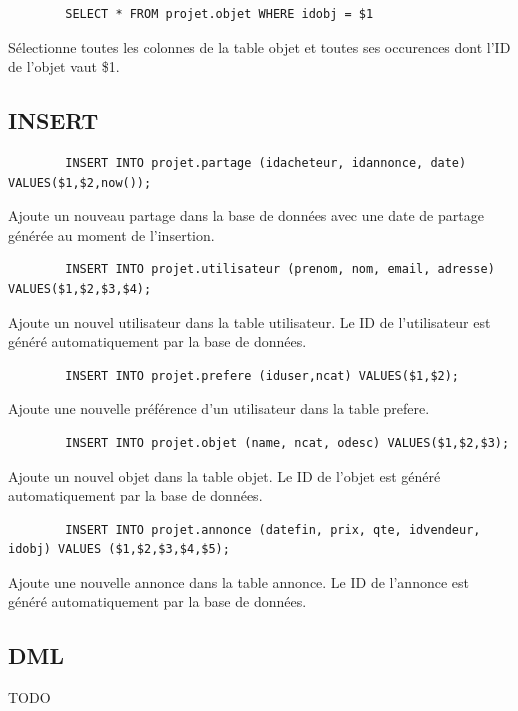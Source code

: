 \documentclass[a4paper,12pt]{article}
\begin{document}
\begin{spacing}{1}
    \begin{verbatim}
        SELECT * FROM projet.objet WHERE idobj = $1
    \end{verbatim}
Sélectionne toutes les colonnes de la table objet et toutes ses occurences dont l'ID de l'objet vaut \$1.

    \subsection*{INSERT}
    
    \begin{verbatim}
        INSERT INTO projet.partage (idacheteur, idannonce, date) VALUES($1,$2,now());
    \end{verbatim}
    Ajoute un nouveau partage dans la base de données avec une date de partage générée au moment de l'insertion.
    
    \begin{verbatim}
        INSERT INTO projet.utilisateur (prenom, nom, email, adresse) VALUES($1,$2,$3,$4);
    \end{verbatim}
    Ajoute un nouvel utilisateur dans la table utilisateur. Le ID de l'utilisateur est généré automatiquement par la base de données. 

    \begin{verbatim}
        INSERT INTO projet.prefere (iduser,ncat) VALUES($1,$2);
    \end{verbatim}
    Ajoute une nouvelle préférence d'un utilisateur dans la table prefere.
    
    \begin{verbatim}
        INSERT INTO projet.objet (name, ncat, odesc) VALUES($1,$2,$3);
    \end{verbatim}
    Ajoute un nouvel objet dans la table objet. Le ID de l'objet est généré automatiquement par la base de données.
    
    \begin{verbatim}
        INSERT INTO projet.annonce (datefin, prix, qte, idvendeur, idobj) VALUES ($1,$2,$3,$4,$5);
    \end{verbatim}
    Ajoute une nouvelle annonce dans la table annonce. Le ID de l'annonce est généré automatiquement par la base de données.


	\subsection*{DML}
	
	TODO

\end{spacing}
\end{document}
